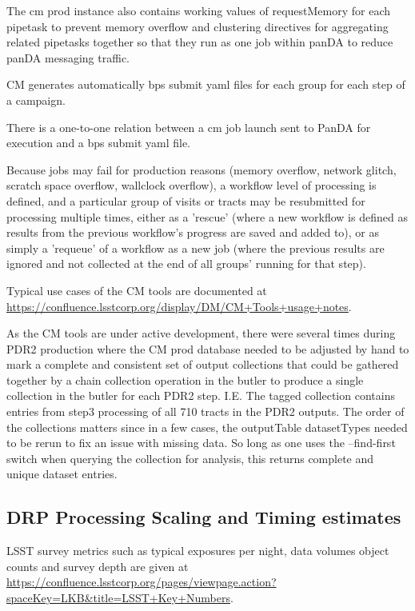 The cm prod instance also contains working values of requestMemory for each pipetask to prevent
memory overflow and clustering directives for aggregating related pipetasks together so that they 
run as one job within panDA to reduce panDA messaging traffic.

CM generates automatically bps submit yaml files for each group for each step of a campaign.

There is a one-to-one relation between a cm job launch sent to PanDA for execution and a bps submit yaml file.

Because jobs may fail for production reasons (memory overflow, network glitch, scratch space overflow,
wallclock overflow), a workflow level of processing is defined, and a particular group of visits or tracts
may be resubmitted for processing multiple times, either as a 'rescue' 
(where a new workflow is defined as results from the previous workflow's progress are 
saved and added to), or as simply a 'requeue' of a workflow as a new
job (where the previous results are ignored and not collected at the end of
all groups' running for that step).

Typical use cases of the CM tools are documented at 
\url{https://confluence.lsstcorp.org/display/DM/CM+Tools+usage+notes}.

As the CM tools are under active development, there were several times during PDR2 production where the CM
prod database needed to be adjusted by hand to mark a complete and consistent set of output collections
that could be gathered together by a chain collection operation in the butler to produce a single 
collection in the butler for each PDR2 step.  I.E. The tagged collection 
 contains entries from step3 processing of 
all 710 tracts in the PDR2 outputs. The order of the collections matters since in a few cases, 
the outputTable datasetTypes needed to be rerun to fix an
issue with missing data.  So long as one uses the --find-first switch when querying 
the collection for analysis, this returns complete and unique dataset entries.

\subsection{DRP Processing Scaling and Timing estimates}

LSST survey metrics such as typical exposures per night, data volumes
object counts and survey depth are given at 
\url{https://confluence.lsstcorp.org/pages/viewpage.action?spaceKey=LKB&title=LSST+Key+Numbers}.


